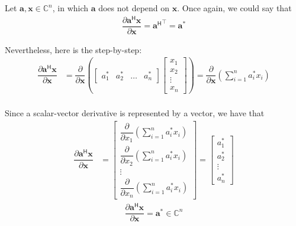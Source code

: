 \documentclass{article}
\newcommand{\trans}{\top}
\newcommand{\hermit}{\mathsf{H}}
\begin{document}
Let \(\mathbf{a, x} \in \mathbb{C}^{n}\), in which \(\mathbf{a}\) does not depend on \(\mathbf{x}\). Once again, we could say that
\begin{align}
    \dfrac{\partial \mathbf{a}^\hermit \mathbf{x}}{\partial \mathbf{x}} = {\mathbf{a}^\hermit}^\trans = \mathbf{a}^*
\end{align}

Nevertheless, here is the step-by-step:
\begin{align}
    \dfrac{\partial \mathbf{a}^\hermit \mathbf{x}}{\partial \mathbf{x}} &= \dfrac{\partial}{\partial \mathbf{x}} \left(
    \begin{bmatrix}
        a^*_1 & a^*_2 & \dots & a^*_n
    \end{bmatrix} \begin{bmatrix}
        x_{1} \\ x_{2} \\ \vdots \\ x_{n}
    \end{bmatrix} \right) 
    = \dfrac{\partial}{\partial \mathbf{x}} \left( \sum_{i = 1}^n a^*_ix_i \right) \\
\end{align}

Since a scalar-vector derivative is represented by a vector, we have that
\begin{align}
    \dfrac{\partial \mathbf{a}^\hermit \mathbf{x}}{\partial \mathbf{x}} &= \begin{bmatrix}
        \dfrac{\partial}{\partial x_1} \left( \sum_{i = 1}^n a^*_ix_i \right) \\ \dfrac{\partial}{\partial x_2} \left( \sum_{i = 1}^n a^*_ix_i \right) \\ \vdots \\ \dfrac{\partial}{\partial x_n} \left( \sum_{i = 1}^n a^*_ix_i \right) 
    \end{bmatrix}
    = \begin{bmatrix}
        a^*_1 \\ a^*_2 \\ \vdots \\ a^*_n
    \end{bmatrix}
\end{align}
\begin{align}
    \boxed{\dfrac{\partial \mathbf{a}^\hermit \mathbf{x}}{\partial \mathbf{x}} = \mathbf{a}^* \in \mathbb{C}^{n}}
\end{align}
\end{document}

